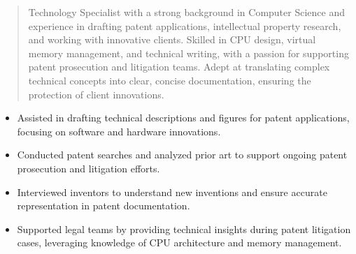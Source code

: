 



\makecvheader

\begin{quote}
  \noindent
  Technology Specialist with a strong background in Computer Science and experience in drafting patent applications, intellectual property research, and working with innovative clients. Skilled in CPU design, virtual memory management, and technical writing, with a passion for supporting patent prosecution and litigation teams. Adept at translating complex technical concepts into clear, concise documentation, ensuring the protection of client innovations.
\end{quote}

\par\smallskip
\noindent
\begin{minipage}{20cm}
  \begin{minipage}{9.75cm}
    \begin{itemize}
      \item Assisted in drafting technical descriptions and figures for patent applications, focusing on software and hardware innovations.
      \item Conducted patent searches and analyzed prior art to support ongoing patent prosecution and litigation efforts.
    \end{itemize}
  \end{minipage}
  \hfill
  \begin{minipage}{9.75cm}
    \begin{itemize}
      \item Interviewed inventors to understand new inventions and ensure accurate representation in patent documentation.
      \item Supported legal teams by providing technical insights during patent litigation cases, leveraging knowledge of CPU architecture and memory management.
    \end{itemize}
  \end{minipage}
\end{minipage}
\par\smallskip
\divider

